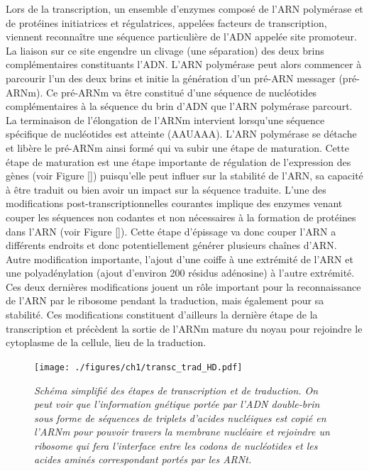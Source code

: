 Lors de la transcription, un ensemble d'enzymes composé de l'ARN polymérase et de protéines initiatrices et régulatrices, appelées facteurs de transcription, viennent reconnaître une séquence particulière de l'ADN appelée site promoteur. La liaison sur ce site engendre un clivage (une séparation) des deux brins complémentaires constituants l'ADN. 
L'ARN polymérase peut alors commencer à parcourir l'un des deux brins et initie la génération d'un pré-ARN messager (pré-ARNm). Ce pré-ARNm va être constitué d'une séquence de nucléotides complémentaires à la séquence du brin d'ADN que l'ARN polymérase parcourt. La terminaison de l'élongation de l'ARNm intervient lorsqu’une séquence spécifique de nucléotides est atteinte (AAUAAA). 
L'ARN polymérase se détache et libère le pré-ARNm ainsi formé qui va subir une étape de maturation. Cette étape de maturation est une étape importante de régulation de l'expression des gènes (voir Figure \ref{}) puisqu'elle peut influer sur la stabilité de l'ARN, sa capacité à être traduit ou bien avoir un impact sur la séquence traduite. 
L'une des modifications post-transcriptionnelles courantes implique des enzymes venant couper les séquences non codantes et non nécessaires à la formation de protéines dans l'ARN (voir Figure \ref{}). Cette étape d'épissage va donc couper l'ARN a différents endroits et donc potentiellement générer plusieurs chaînes d'ARN. Autre modification importante, l'ajout d'une coiffe à une extrémité de l'ARN et une polyadénylation (ajout d'environ 200 résidus adénosine) à l'autre extrémité. Ces deux dernières modifications jouent un rôle important pour la reconnaissance de l'ARN par le ribosome pendant la traduction, mais également pour sa stabilité. Ces modifications constituent d'ailleurs la dernière étape de la transcription et précèdent la sortie de l'ARNm mature du noyau pour rejoindre le cytoplasme de la cellule, lieu de la traduction.

\begin{figure}
  \centering
  {\texttt{[image: ./figures/ch1/transc\_trad\_HD.pdf]}}
    \caption{\it Schéma simplifié des étapes de transcription et de traduction. On peut voir que l'information gnétique portée par l'ADN double-brin sous forme de séquences de triplets d'acides nucléiques est copié en l'ARNm pour pouvoir travers la membrane nucléaire et rejoindre un ribosome qui fera l'interface entre les codons de nucléotides et les acides aminés correspondant portés par les ARNt.}
    \label{Fig:transc_trad_HD}
  \hspace{0.2cm}
\end{figure}


